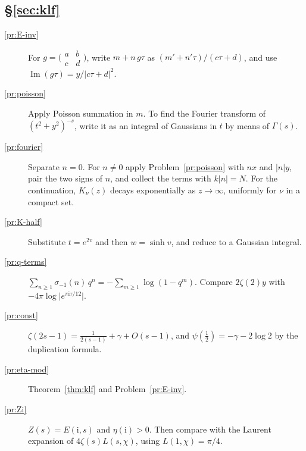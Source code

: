 \documentclass[reqno]{amsart}
\theoremstyle{definition}
\theoremstyle{plain}
\newcommand{\ii}{\mathrm{i}}
\begin{document}
\subsection*{\S\ref{sec:klf}}
\begin{description}
\item[\ref{pr:E-inv}] For \(g = \bigl(\begin{smallmatrix} a & b \\ c & d \end{smallmatrix}\bigr)\), write \(m + n\, g\tau\) as \((m' + n'\tau)/(c\tau + d)\), and use \(\operatorname{Im}(g\tau) = y/\lvert c\tau + d\rvert^2\).
\item[\ref{pr:poisson}] Apply Poisson summation in \(m\).  To find the Fourier transform of \((t^2 + y^2)^{-s}\), write it as an integral of Gaussians in \(t\) by means of \(\Gamma(s)\).
\item[\ref{pr:fourier}] Separate \(n = 0\).  For \(n\ne0\) apply Problem~\ref{pr:poisson} with \(nx\) and \(\lvert n\rvert y\), pair the two signs of \(n\), and collect the terms with \(k\lvert n\rvert=N\).  For the continuation, \(K_\nu(z)\) decays exponentially as \(z \to \infty\), uniformly for \(\nu\) in a compact set.
\item[\ref{pr:K-half}] Substitute \(t = e^{2v}\) and then \(w = \sinh v\), and reduce to a Gaussian integral.
\item[\ref{pr:q-terms}] \(\sum_{n \ge 1} \sigma_{-1}(n)\, q^n = -\sum_{m \ge 1}\log(1 - q^m)\).  Compare \(2\zeta(2)y\) with \(-4\pi\log\lvert e^{\pi\ii\tau/12}\rvert\).
\item[\ref{pr:const}] \(\zeta(2s - 1) = \frac{1}{2(s-1)} + \gamma + O(s-1)\), and \(\psi(\frac12) = -\gamma - 2\log 2\) by the duplication formula.
\item[\ref{pr:eta-mod}] Theorem~\ref{thm:klf} and Problem~\ref{pr:E-inv}.
\item[\ref{pr:Zi}] \(Z(s) = E(\ii, s)\) and \(\eta(\ii) > 0\).  Then compare with the Laurent expansion of \(4\zeta(s)L(s,\chi)\), using \(L(1, \chi) = \pi/4\).
\end{description}
\end{document}
